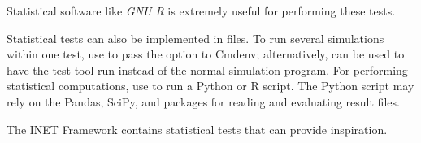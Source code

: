 Statistical software like \textit{GNU R} is extremely useful for performing
these tests.

Statistical tests can also be implemented in  files. To run several
simulations within one test, use  to pass the  option to Cmdenv; alternatively,  can be used to have
the test tool run  instead of the normal simulation program.
For performing statistical computations, use  to run a
Python or R script. The Python script may rely on the Pandas, SciPy, and 
packages for reading and evaluating {\opp} result files.

The INET Framework contains statistical tests that can provide inspiration.



